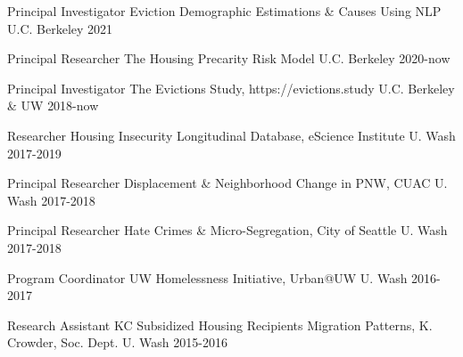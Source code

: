 



\begin{cvhonors}

  \cvhonor
    {Principal Investigator} %
    {Eviction Demographic Estimations \& Causes Using NLP} %
    {U.C. Berkeley} %
    {2021} %

  \cvhonor
    {Principal Researcher} %
    {The Housing Precarity Risk Model} %
    {U.C. Berkeley} %
    {2020-now} %

  \cvhonor
    {Principal Investigator} %
    {The Evictions Study, https://evictions.study} %
    {U.C. Berkeley \& UW} %
    {2018-now} %

  \cvhonor
    {Researcher} %
    {Housing Insecurity Longitudinal Database, eScience Institute} %
    {U. Wash} %
    {2017-2019} %

  \cvhonor
    {Principal Researcher} %
    {Displacement \& Neighborhood Change in PNW, CUAC} %
    {U. Wash} %
    {2017-2018} %

  \cvhonor
    {Principal Researcher} %
    {Hate Crimes \& Micro-Segregation, City of Seattle} %
    {U. Wash} %
    {2017-2018} %

  \cvhonor
    {Program Coordinator} %
    {UW Homelessness Initiative, Urban@UW} %
    {U. Wash} %
    {2016-2017} %

  \cvhonor
    {Research Assistant} %
    {KC Subsidized Housing Recipients Migration Patterns, K. Crowder, Soc. Dept.} %
    {U. Wash} %
    {2015-2016} %


\end{cvhonors}
